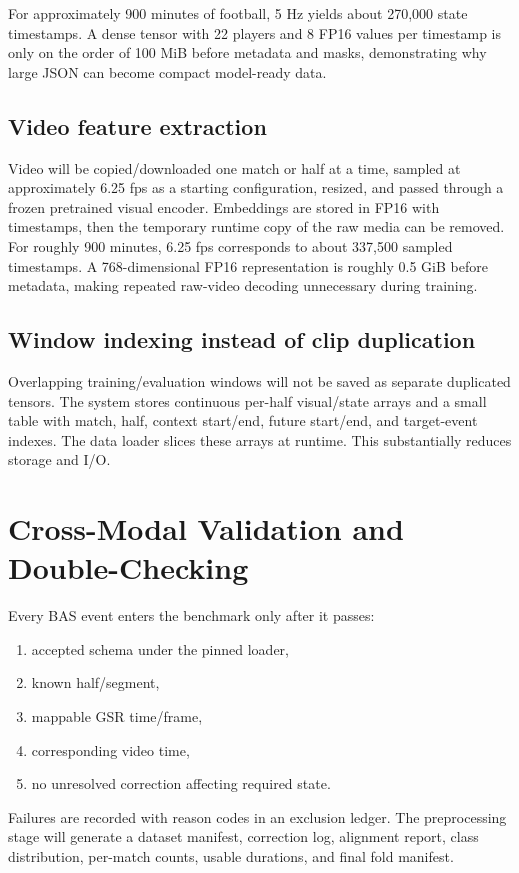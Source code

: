 \documentclass[11pt,a4paper]{article}
\begin{document}
For approximately 900 minutes of football, 5 Hz yields about 270,000 state timestamps. A dense tensor with 22 players and 8 FP16 values per timestamp is only on the order of 100 MiB before metadata and masks, demonstrating why large JSON can become compact model-ready data.

\subsection{Video feature extraction}
Video will be copied/downloaded one match or half at a time, sampled at approximately 6.25 fps as a starting configuration, resized, and passed through a frozen pretrained visual encoder. Embeddings are stored in FP16 with timestamps, then the temporary runtime copy of the raw media can be removed. For roughly 900 minutes, 6.25 fps corresponds to about 337,500 sampled timestamps. A 768-dimensional FP16 representation is roughly 0.5 GiB before metadata, making repeated raw-video decoding unnecessary during training.

\subsection{Window indexing instead of clip duplication}
Overlapping training/evaluation windows will not be saved as separate duplicated tensors. The system stores continuous per-half visual/state arrays and a small table with match, half, context start/end, future start/end, and target-event indexes. The data loader slices these arrays at runtime. This substantially reduces storage and I/O.

\section{Cross-Modal Validation and Double-Checking}
Every BAS event enters the benchmark only after it passes:
\begin{enumerate}
  \item accepted schema under the pinned loader,
  \item known half/segment,
  \item mappable GSR time/frame,
  \item corresponding video time,
  \item no unresolved correction affecting required state.
\end{enumerate}
Failures are recorded with reason codes in an exclusion ledger. The preprocessing stage will generate a dataset manifest, correction log, alignment report, class distribution, per-match counts, usable durations, and final fold manifest.
\end{document}

